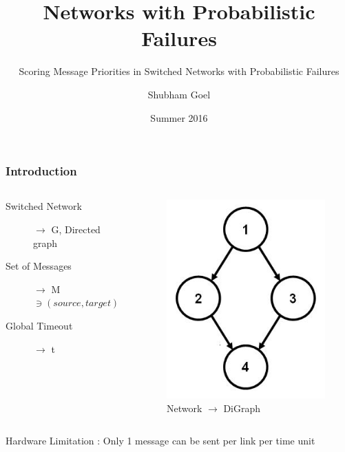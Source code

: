 \documentclass{beamer}
\begin{document}
\title[Probabilistic Networks]{Networks with Probabilistic Failures}
\subtitle[Probabilistically Scoring Message Priorities]{Scoring Message Priorities in Switched Networks with Probabilistic Failures}
\author[Shubham]{Shubham Goel}
\date[Summer 2016]{Summer 2016}

\begin{frame}[plain]
  \titlepage
\end{frame}

\begin{frame}
\frametitle{Introduction}
	\begin{columns}
	\begin{description}
	\item[Switched Network] $\to$ G, Directed graph
	\item[Set of Messages] $\to$ M $\ni (source,target)$
	\item[Global Timeout] $\to$ t
	\end{description}
	\begin{figure}
	\includegraphics[scale=0.3]{media/digraph2.jpg}
	\caption{Network $\to$ DiGraph}
	\end{figure}
	\end{columns}
	\vspace*{20pt}
	Hardware Limitation : Only 1 message can be sent per link per time unit
\end{frame}
\end{document}
